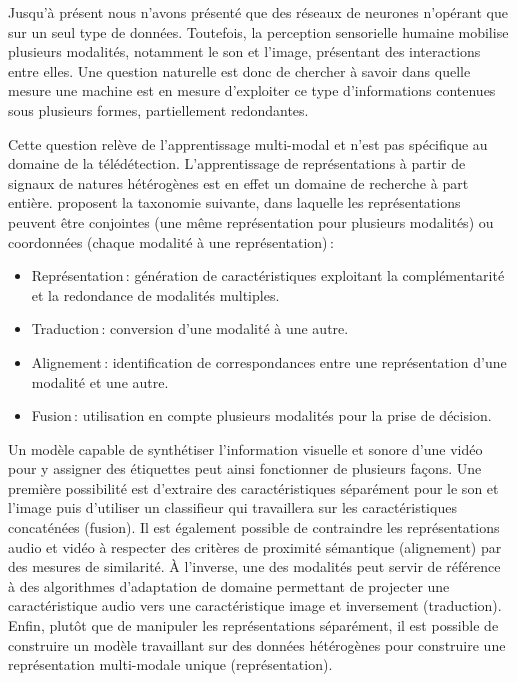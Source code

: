 Jusqu'à présent nous n'avons présenté que des réseaux de neurones n'opérant que sur un seul type de données. Toutefois, la perception sensorielle humaine mobilise plusieurs modalités, notamment le son et l'image, présentant des interactions entre elles. Une question naturelle est donc de chercher à savoir dans quelle mesure une machine est en mesure d'exploiter ce type d'informations contenues sous plusieurs formes, partiellement redondantes.

Cette question relève de l'apprentissage multi-modal et n'est pas spécifique au domaine de la télédétection. L'apprentissage de représentations à partir de signaux de natures hétérogènes est en effet un domaine de recherche à part entière. \citet{baltrusaitis_multimodal_2017} proposent la taxonomie suivante, dans laquelle les représentations peuvent être conjointes (une même représentation pour plusieurs modalités) ou coordonnées (chaque modalité à une représentation)\,:
\begin{itemize}
    \item Représentation\,: génération de caractéristiques exploitant la complémentarité et la redondance de modalités multiples.
    \item Traduction\,: conversion d'une modalité à une autre.
    \item Alignement\,: identification de correspondances entre une représentation d'une modalité et une autre.
    \item Fusion\,: utilisation en compte plusieurs modalités pour la prise de décision.
\end{itemize}

Un modèle capable de synthétiser l'information visuelle et sonore d'une vidéo pour y assigner des étiquettes peut ainsi fonctionner de plusieurs façons. Une première possibilité est d'extraire des caractéristiques séparément pour le son et l'image puis d'utiliser un classifieur qui travaillera sur les caractéristiques concaténées (fusion). Il est également possible de contraindre les représentations audio et vidéo à respecter des critères de proximité sémantique (alignement) par des mesures de similarité. À l'inverse, une des modalités peut servir de référence à des algorithmes d'adaptation de domaine permettant de projecter une caractéristique audio vers une caractéristique image et inversement (traduction). Enfin, plutôt que de manipuler les représentations séparément, il est possible de construire un modèle travaillant sur des données hétérogènes pour construire une représentation multi-modale unique (représentation).

